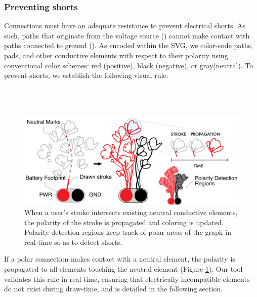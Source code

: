 \documentclass{sigchi}
\begin{document}
    \subsubsection{Preventing shorts}
    Connections must have an adequate resistance to prevent electrical shorts. As such, paths that originate from the voltage source () cannot make contact with paths connected to ground (). As encoded within the SVG, we color-code paths, pads, and other conductive elements with respect to their polarity using conventional color schemes: red (positive), black (negative), or gray(neutral). To prevent shorts, we establish the following visual rule:
    \\
    \\
    \noindent{}
    \\
    \\
\begin{figure}[h]
\centering
\includegraphics[width=1.0\columnwidth]{figures/propagation.pdf}
\caption{When a user's stroke intersects existing neutral conductive elements, the polarity of the stroke is propagated and coloring is updated. Polarity detection regions keep track of polar areas of the graph in real-time so as to detect shorts.}

\label{fig:propagation}
\end{figure}
    If a polar connection makes contact with a neutral element, the polarity is propagated to all elements touching the neutral element (Figure \ref{fig:propagation}). 
    Our tool validates this rule in real-time, ensuring that electrically-incompatible elements do not exist during draw-time, and is detailed in the following section. 

    \noindent{}
\end{document}

